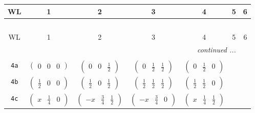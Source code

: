 \documentclass[fleqn,9pt,landscape]{jsarticle}
\begin{document}
\begin{center}
\renewcommand{\arraystretch}{1.2}
\begin{longtable}{ccccccc}
 \hline \hline
WL & 1 & 2 & 3 & 4 & 5 & 6 \\ \hline \endfirsthead

\multicolumn{6}{l}{\tablename\ \thetable{}} \\
 \hline \hline
WL & 1 & 2 & 3 & 4 & 5 & 6 \\ \hline \endhead

 \hline \hline
\multicolumn{6}{r}{\footnotesize\it continued ...} \\ \endfoot

 \hline \hline
\multicolumn{6}{r}{} \\ \endlastfoot

{\tt 4a} & $ \begin{pmatrix} 0 & 0 & 0 \end{pmatrix} $ & $ \begin{pmatrix} 0 & 0 & \frac{1}{2} \end{pmatrix} $ & $ \begin{pmatrix} 0 & \frac{1}{2} & \frac{1}{2} \end{pmatrix} $ & $ \begin{pmatrix} 0 & \frac{1}{2} & 0 \end{pmatrix} $ & $  $ & $  $ \\ \hline
{\tt 4b} & $ \begin{pmatrix} \frac{1}{2} & 0 & 0 \end{pmatrix} $ & $ \begin{pmatrix} \frac{1}{2} & 0 & \frac{1}{2} \end{pmatrix} $ & $ \begin{pmatrix} \frac{1}{2} & \frac{1}{2} & \frac{1}{2} \end{pmatrix} $ & $ \begin{pmatrix} \frac{1}{2} & \frac{1}{2} & 0 \end{pmatrix} $ & $  $ & $  $ \\ \hline
{\tt 4c} & $ \begin{pmatrix} x & \frac{1}{4} & 0 \end{pmatrix} $ & $ \begin{pmatrix} - x & \frac{3}{4} & \frac{1}{2} \end{pmatrix} $ & $ \begin{pmatrix} - x & \frac{3}{4} & 0 \end{pmatrix} $ & $ \begin{pmatrix} x & \frac{1}{4} & \frac{1}{2} \end{pmatrix} $ & $  $ & $  $ \\ \hline

\end{longtable}
\end{center}
\end{document}

